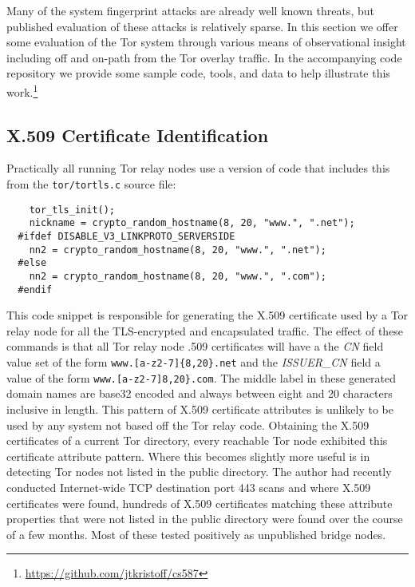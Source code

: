 \documentclass[sigconf]{acmart}
\begin{document}
Many of the system fingerprint attacks are already well known threats,
but published evaluation of these attacks is relatively sparse.  In this
section we offer some evaluation of the Tor system through various means
of observational insight including off and on-path from the Tor overlay
traffic.  In the accompanying code repository we provide some sample
code, tools, and data to help illustrate this
work.\footnote{\url{https://github.com/jtkristoff/cs587}}

\subsection{X.509 Certificate Identification}

Practically all running Tor relay nodes use a version of code that
includes this from the \texttt{tor/tortls.c} source file:

\begin{footnotesize}
\begin{verbatim}
    tor_tls_init();
    nickname = crypto_random_hostname(8, 20, "www.", ".net");
  #ifdef DISABLE_V3_LINKPROTO_SERVERSIDE
    nn2 = crypto_random_hostname(8, 20, "www.", ".net");
  #else
    nn2 = crypto_random_hostname(8, 20, "www.", ".com");
  #endif
\end{verbatim}
\end{footnotesize}

This code snippet is responsible for generating the X.509 certificate
used by a Tor relay node for all the TLS-encrypted and encapsulated
traffic.  The effect of these commands is that all Tor relay node
.509 certificates will have a the \emph{CN} field value set of the form
\texttt{www.[a-z2-7]\{8,20\}.net} and the \emph{ISSUER\_CN} field a value
of the form \texttt{www.[a-z2-7]8,20\}.com}.  The middle label in these
generated domain names are base32 encoded and always between eight and
20 characters inclusive in length.  This pattern of X.509 certificate
attributes is unlikely to be used by any system not based off the Tor
relay code.  Obtaining the X.509 certificates of a current Tor
directory, every reachable Tor node exhibited this certificate attribute
pattern.  Where this becomes slightly more useful is in detecting Tor
nodes not listed in the public directory.  The author had recently
conducted Internet-wide TCP destination port 443 scans and where X.509
certificates were found, hundreds of X.509 certificates matching these
attribute properties that were not listed in the public directory were
found over the course of a few months.  Most of these tested positively
as unpublished bridge nodes.
\end{document}
